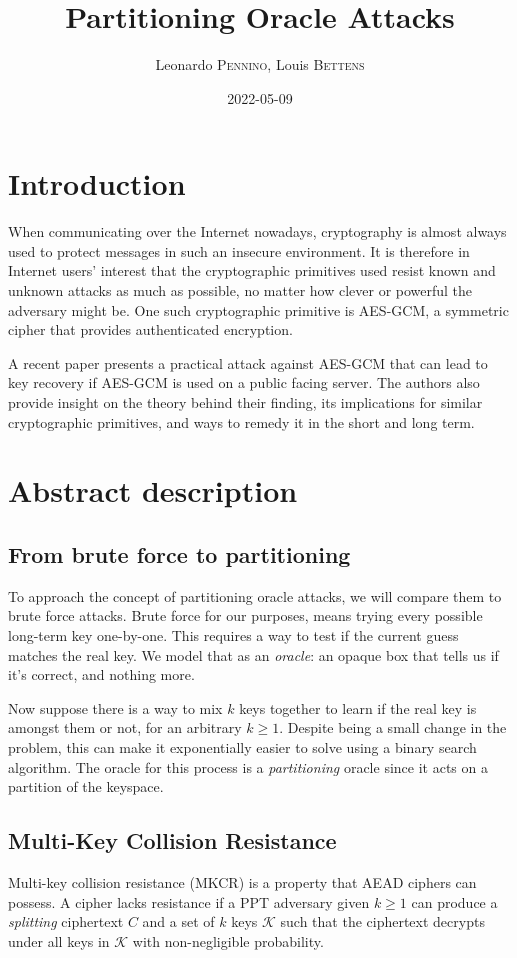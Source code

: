 \documentclass[9pt, a4paper]{article}
\date{2022-05-09}
\title{Partitioning Oracle Attacks}
\author{Leonardo \textsc{Pennino}, Louis \textsc{Bettens}}
\begin{document}
\maketitle

\section{Introduction}

When communicating over the Internet nowadays,
cryptography is almost always used to protect messages
in such an insecure environment.
It is therefore in Internet users' interest that
the cryptographic primitives used resist
known and unknown attacks as much as possible,
no matter how clever or powerful the adversary might be.
One such cryptographic primitive is AES-GCM\cite{aes-gcm},
a symmetric cipher that provides authenticated encryption.

A recent paper\cite{partitioning}
presents a practical attack against AES-GCM
that can lead to key recovery if AES-GCM is used on a public facing server.
The authors also provide insight on the theory behind their finding, 
its implications for similar cryptographic primitives,
and ways to remedy it in the short and long term.

\section{Abstract description}
\subsection{From brute force to partitioning}
To approach the concept of partitioning oracle attacks,
we will compare them to brute force attacks.
Brute force for our purposes, means
trying every possible long-term key one-by-one.
This requires a way to test if the current guess matches the real key.
We model that as an \emph{oracle}: an opaque box that tells us if it's correct, and nothing more.

Now suppose there is a way to mix $k$ keys together
to learn if the real key is amongst them or not,
for an arbitrary $k \geq 1$.
Despite being a small change in the problem,
this can make it exponentially easier to solve
using a binary search algorithm.
The oracle for this process is a \emph{partitioning} oracle since it acts on a partition of the keyspace.

\subsection{Multi-Key Collision Resistance}
Multi-key collision resistance (MKCR) is a property that AEAD ciphers can possess.
A cipher lacks resistance if a PPT adversary given $k \geq 1$ can produce a \emph{splitting} ciphertext $C$ and a set of $k$ keys $\mathcal K$ such that the ciphertext decrypts under all keys in $\mathcal K$ with non-negligible probability.
\end{document}
